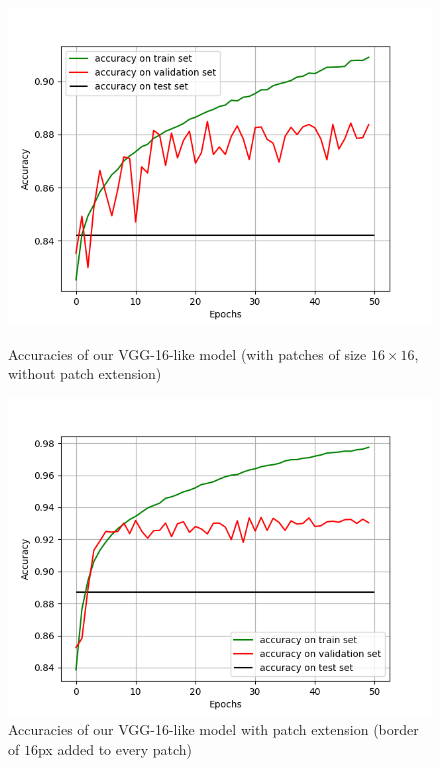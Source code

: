 \documentclass[10pt,conference,compsocconf]{IEEEtran}
\begin{document}
\begin{figure}[h]
	\centering
	\begin{minipage}[b]{0.48\linewidth}
		\includegraphics[width=\textwidth]{CNN_with_border_0.png}
		\captionsetup{aboveskip=0.1cm,justification=centering, margin=0.1cm, labelfont=footnotesize, textfont=footnotesize}
		\caption{Accuracies of our VGG-16-like model (with patches of size $16 \times 16$, without patch extension)}
		\label{fig:noExtensions}
	\end{minipage}
	\hspace{0.05cm}
	\begin{minipage}[b]{0.48\linewidth}
		\includegraphics[width=\textwidth]{CNN_with_border_16.png}
		\captionsetup{aboveskip=0.1cm,justification=centering, margin=0.1cm, labelfont=footnotesize, textfont=footnotesize}
		\caption{Accuracies of our VGG-16-like model with patch extension (border of $16$px added to every patch)}
		\label{fig:extensions}
	\end{minipage}
\end{figure}
\end{document}
